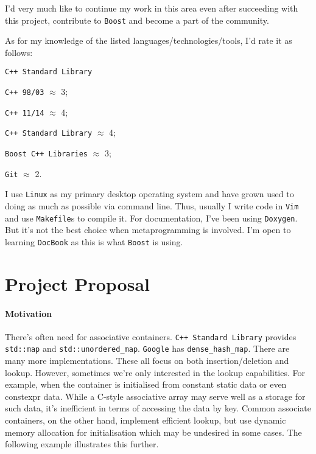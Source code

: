 \documentclass[a4paper,12pt]{article}
\begin{document}
    I'd very much like to continue my work in this area even after succeeding with this project, contribute to \texttt{Boost} and become a part of the community.

    As for my knowledge of the listed languages/technologies/tools, I'd rate it as follows:
    \begin{labeling}{\texttt{C++ Standard Library}}
    \item [\texttt{C++ 98/03}] $\approx$ 3;
    \item [\texttt{C++ 11/14}] $\approx$ 4;
    \item [\texttt{C++ Standard Library}] $\approx$ 4;
    \item [\texttt{Boost C++ Libraries}] $\approx$ 3;
    \item [\texttt{Git}] $\approx$ 2.
    \end{labeling}

    I use \texttt{Linux} as my primary desktop operating system and have grown used to doing as much as possible via command line. Thus, usually I write code in \texttt{Vim} and use \texttt{Makefile}s to compile it. For documentation, I've been using \texttt{Doxygen}. But it's not the best choice when metaprogramming is involved. I'm open to learning \texttt{DocBook} as this is what \texttt{Boost} is using.

\section{Project Proposal}
   
    \paragraph{Motivation} There's often need for associative containers. \texttt{C++ Standard Library} provides \texttt{std::map} and \texttt{std::unordered\_map}. \texttt{Google} has \texttt{dense\_hash\_map}. There are many more implementations. These all focus on both insertion/deletion and lookup. However, sometimes we're only interested in the lookup capabilities. For example, when the container is initialised from constant static data or even constexpr data. While a C-style associative array may serve well as a storage for such data, it's inefficient in terms of accessing the data by key. Common associate containers, on the other hand, implement efficient lookup, but use dynamic memory allocation for initialisation which may be undesired in some cases. The following example illustrates this further.
\end{document}
